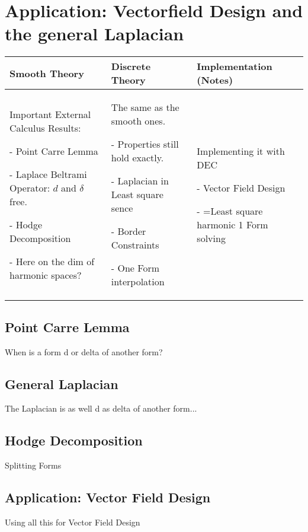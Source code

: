 \documentclass[]{scrbook}
\newenvironment{packed_enum}{
\begin{enumerate}
  \setlength{\itemsep}{1pt}
  \setlength{\parskip}{0pt}
  \setlength{\parsep}{0pt}
}{\end{enumerate}}
\begin{document}
\section{Application: Vectorfield Design and the general Laplacian}
	\begin{longtable}{|p{4.5cm}|p{4.5cm}|p{4.5cm}|}
		\hline
		Smooth Theory& Discrete Theory& Implementation (Notes)\\
		\hline
			Important External Calculus Results:
			\begin{packed_enum}
				\item[-] Point Carre Lemma
				\item[-] Laplace Beltrami Operator: $d$ and $\delta$ free.
				\item[-] Hodge Decomposition
				\item[-] Here on the dim of harmonic spaces?
			\end{packed_enum}
			&
			The same as the smooth ones.
			\begin{packed_enum}
				\item[-] Properties still hold exactly.
				\item[-] Laplacian in Least square sence
				\item[-] Border Constraints
				\item[-] One Form interpolation
			\end{packed_enum}
			 & 
			 Implementing it with DEC
			 \begin{packed_enum}
				\item[-] Vector Field Design
				\item[-] =Least square harmonic 1 Form solving
			\end{packed_enum}
			 \\		
		\hline
	\end{longtable}
	\subsection{Point Carre Lemma}
	When is a form d or delta of another form?
	\subsection{General Laplacian}
	The Laplacian is as well d as delta of another form...
	\subsection{Hodge Decomposition}
	Splitting Forms
	\subsection{Application: Vector Field Design}
	Using all this for Vector Field Design
\end{document}
